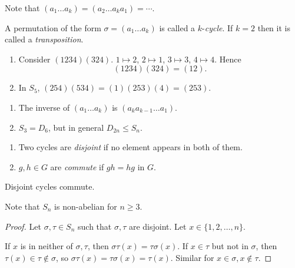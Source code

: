 \documentclass[a4paper]{article}
\newcommand{\bluecomment}[1]{{\color{blue}#1}}
\begin{document}
    Note that $ (a_1 \dots a_k)=(a_2\dots a_{k} a_1)=\cdots $.
    \begin{definition}
        A permutation of the form $ \sigma = (a_1 \dots a_k) $ is called a $k$-\textit{cycle}. If $k=2$ then it is called a \textit{transposition}.
    \end{definition}
    \begin{example}
        \begin{enumerate}[(1).]
            \item Consider $ (1234)(324) $. $ 1 \mapsto 2 $, $ 2 \mapsto 1 $, $ 3 \mapsto 3 $, $4 \mapsto 4 $. Hence
            \[
                (1234)(324)=(12)
            .\]
            \item In $S_5$, $ (254)(534)=(1)(253)(4) = (253) $.
        \end{enumerate}
    \end{example}
    \begin{remark}
        \begin{enumerate}[(1).]
            \item The inverse of $ (a_1 \dots a_k) $ is $ (a_k a_{k-1}\dots a_1) $.
            \item $ S_3=D_6 $, but in general $ D_{2n}\le S_n $.
        \end{enumerate}
    \end{remark}
    \begin{definition}
        \begin{enumerate}[(1).]
            \item Two cycles are \textit{disjoint} if no element appears in both of them.
            \item $ g,h\in G $ are \textit{commute} if $gh=hg$ in $G$.
        \end{enumerate}
    \end{definition}
    \begin{lemma}\label{lma:disjoint_cyc_commute}
        Disjoint cycles commute.

        \bluecomment{Note that $S_n$ is non-abelian for $n\ge 3$.}
    \end{lemma}
    \begin{proof}
        Let $ \sigma, \tau\in S_n $ such that $ \sigma, \tau $ are disjoint. Let $ x\in \{1,2,\dots,n\} $.

        If $x$ is in neither of $\sigma, \tau$, then $ \sigma \tau(x)=\tau \sigma(x) $. If $ x\in \tau $ but not in $ \sigma $, then $ \tau(x)\in \tau\notin \sigma $, so $ \sigma \tau(x)=\tau \sigma(x)=\tau(x) $. Similar for $ x\in \sigma, x\notin \tau $.
    \end{proof}
\end{document}
